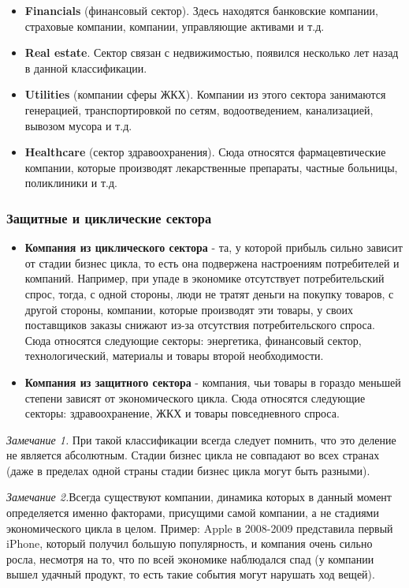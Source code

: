 \documentclass{article}
\begin{document}
\begin{itemize}
	\item \textbf{Financials} (финансовый сектор). Здесь находятся банковские компании, страховые компании, компании, управляющие активами и т.д.
	
	\item \textbf{Real estate}. Сектор связан с недвижимостью, появился несколько лет назад в данной классификации.
	
	\item \textbf{Utilities} (компании сферы ЖКХ). Компании из этого сектора занимаются генерацией, транспортировкой по сетям, водоотведением, канализацией, вывозом мусора и т.д.
	
	\item \textbf{Healthcare} (сектор здравоохранения). Сюда относятся фармацевтические компании, которые производят лекарственные препараты, частные больницы, поликлиники и т.д.
	\end{itemize}
	
	
	
	\subsubsection {Защитные и циклические сектора}
	\begin{itemize}
	\item \textbf{Компания из циклического сектора} - та, у которой прибыль сильно зависит от стадии бизнес цикла, то есть она подвержена настроениям потребителей и компаний. Например, при упаде в экономике отсутствует потребительский спрос, тогда, с одной стороны, люди не тратят деньги на покупку товаров, с другой стороны, компании, которые производят эти товары, у своих поставщиков заказы снижают из-за отсутствия потребительского спроса. Сюда относятся следующие секторы: энергетика, финансовый сектор, технологический, материалы и товары второй необходимости.
	
	\item \textbf{Компания из защитного сектора} - компания, чьи товары в гораздо меньшей степени зависят от экономического цикла. Сюда относятся следующие секторы: здравоохранение, ЖКХ и товары повседневного спроса.
	\end{itemize}

	\textit{Замечание 1.} При такой классификации всегда следует помнить, что это деление не является абсолютным. Стадии бизнес цикла не совпадают во всех странах (даже в пределах одной страны стадии бизнес цикла могут быть разными).
	
	 \textit{Замечание 2.}Всегда существуют компании, динамика которых в данный момент определяется именно факторами, присущими самой компании, а не стадиями экономического цикла в целом. Пример: Apple в 2008-2009 представила первый iPhone, который получил большую популярность, и компания очень сильно росла, несмотря на то, что по всей экономике наблюдался спад (у компании вышел удачный продукт, то есть такие события могут нарушать ход вещей).
	
\end{document}
